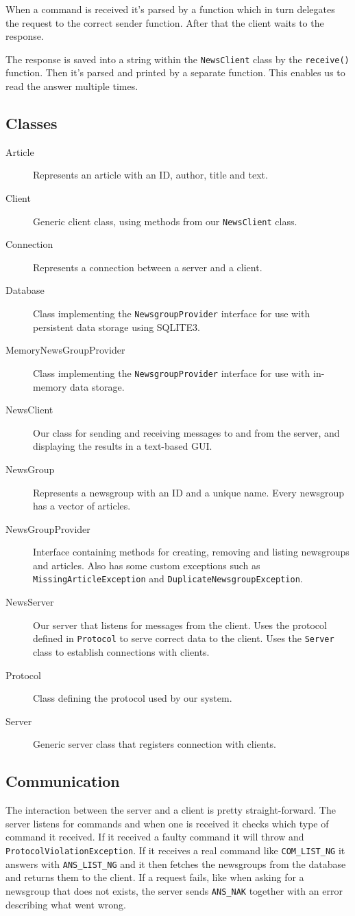 \documentclass[12pt]{article}
\begin{document}
When a command is received it's parsed by a function which in turn delegates the request to the correct sender function. After that the client waits to the response.

The response is saved into a string within the \verb!NewsClient! class by the \verb!receive()! function. Then it's parsed and printed by a separate function. This enables us to read the answer multiple times.

\subsection{Classes}
\begin{description}
\item[Article] Represents an article with an ID, author, title and text.
\item[Client] Generic client class, using methods from our \verb!NewsClient! class.
\item[Connection] Represents a connection between a server and a client.
\item[Database] Class implementing the \verb!NewsgroupProvider! interface for use with persistent data storage using SQLITE3.
\item[MemoryNewsGroupProvider] Class implementing the \verb!NewsgroupProvider! interface for use with in-memory data storage.
\item[NewsClient] Our class for sending and receiving messages to and from the server, and displaying the results in a text-based GUI. 
\item[NewsGroup] Represents a newsgroup with an ID and a unique name. Every newsgroup has a vector of articles.
\item[NewsGroupProvider] Interface containing methods for creating, removing and listing newsgroups and articles. Also has some custom exceptions such as \verb!MissingArticleException! and \verb!DuplicateNewsgroupException!.
\item[NewsServer] Our server that listens for messages from the client. Uses the protocol defined in \verb!Protocol! to serve correct data to the client. Uses the \verb!Server! class to establish connections with clients.
\item[Protocol] Class defining the protocol used by our system.
\item[Server] Generic server class that registers connection with clients.
\end{description}
\subsection{Communication}
The interaction between the server and a client is pretty straight-forward. The server listens for commands and when one is received it checks which type of command it received. If it received a faulty command it will throw and \verb!ProtocolViolationException!. If it receives a real command like \verb!COM_LIST_NG! it answers with \verb!ANS_LIST_NG! and it then fetches the newsgroups from the database and returns them to the client. If a request fails, like when asking for a newsgroup that does not exists, the server sends \verb!ANS_NAK! together with an error describing what went wrong.
\end{document}
